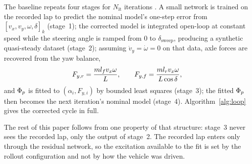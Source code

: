 The baseline repeats four stages for $N_{\mathrm{it}}$ iterations
\cite{ontrack2025}. A small network is trained on the recorded lap to predict
the nominal model's one-step error from $[v_{x},v_{y},\omega,\delta]_{k}$
(stage~1); the corrected model is integrated open-loop at constant speed while
the steering angle is ramped from $0$ to $\delta_{\mathrm{sweep}}$, producing a
synthetic quasi-steady dataset (stage~2); assuming $\dot v_{y}=\dot\omega=0$ on
that data, axle forces are recovered from the yaw balance,
\begin{equation}
F_{y,r}=\frac{m l_{f}v_{x}\omega}{L},\qquad
F_{y,f}=\frac{m l_{r} v_{x}\omega}{L\cos\delta},
\label{eq:ssforces}
\end{equation}
and $\Phi_{p}$ is fitted to $(\alpha_{i},F_{y,i})$ by bounded least squares
(stage~3); the fitted $\Phi_{p}$ then becomes the next iteration's nominal model
(stage~4). Algorithm~\ref{alg:loop} gives the corrected cycle in full.

The rest of this paper follows from one property of that structure: stage~3
never sees the recorded lap, only the output of stage~2. The recorded lap
enters only through the residual network, so the excitation available to the
fit is set by the rollout configuration and not by how the vehicle was driven.
